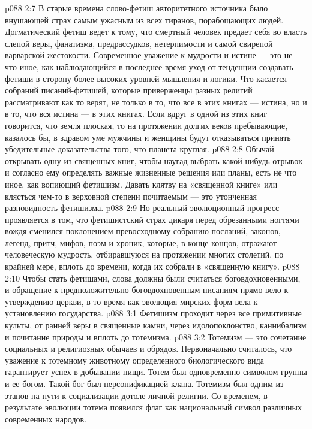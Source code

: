 \vs p088 2:7 В старые времена слово\hyp{}фетиш авторитетного источника было внушающей страх  самым ужасным из всех тиранов, порабощающих людей. Догматический фетиш ведет к тому, что смертный человек предает себя во власть слепой веры, фанатизма, предрассудков, нетерпимости и самой свирепой варварской жестокости. Современное уважение к мудрости и истине --- это не что иное, как наблюдающийся в последнее время уход от тенденции создавать фетиши в сторону более высоких уровней мышления и логики. Что касается собраний писаний\hyp{}фетишей, которые приверженцы разных религий рассматривают как  то верят, не только в то, что все в этих книгах --- истина, но и в то, что вся истина --- в этих книгах. Если вдруг в одной из этих книг говорится, что земля плоская, то на протяжении долгих веков пребывающие, казалось бы, в здравом уме мужчины и женщины будут отказываться принять убедительные доказательства того, что планета круглая.
\vs p088 2:8 Обычай открывать одну из священных книг, чтобы наугад выбрать какой\hyp{}нибудь отрывок и согласно ему определять важные жизненные решения или планы, есть не что иное, как вопиющий фетишизм. Давать клятву на «священной книге» или клясться чем\hyp{}то в верховной степени почитаемым --- это утонченная разновидность фетишизма.
\vs p088 2:9 Но реальный эволюционный прогресс проявляется в том, что фетишистский страх дикаря перед обрезанными ногтями вождя сменился поклонением превосходному собранию посланий, законов, легенд, притч, мифов, поэм и хроник, которые, в конце концов, отражают человеческую мудрость, отбиравшуюся на протяжении многих столетий, по крайней мере, вплоть до времени, когда их собрали в «священную книгу».
\vs p088 2:10 Чтобы стать фетишами, слова должны были считаться боговдохновенными, и обращение к предположительно боговдохновенным писаниям прямо вело к утверждению  церкви, в то время как эволюция мирских форм вела к установлению  государства.
\vs p088 3:1 Фетишизм проходит через все примитивные культы, от ранней веры в священные камни, через идолопоклонство, каннибализм и почитание природы и вплоть до тотемизма.
\vs p088 3:2 Тотемизм --- это сочетание социальных и религиозных обычаев и обрядов. Первоначально считалось, что уважение к тотемному животному определенного биологического вида гарантирует успех в добывании пищи. Тотем был одновременно символом группы и ее богом. Такой бог был персонификацией клана. Тотемизм был одним из этапов на пути к социализации дотоле личной религии. Со временем, в результате эволюции тотема появился флаг как национальный символ различных современных народов.
